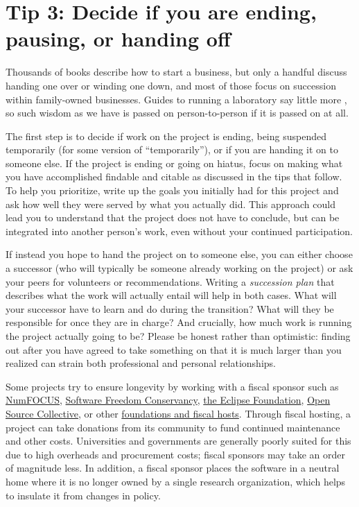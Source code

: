 \documentclass[10pt,letterpaper]{article}
\begin{document}
\section*{Tip 3: Decide if you are ending, pausing, or handing off}

Thousands of books describe how to start a business,
but only a handful discuss handing one over or winding one down,
and most of those focus on succession within family-owned businesses.
Guides to running a laboratory say little more \cite{Barker2010,Cohen2018},
so such wisdom as we have is passed on person-to-person if it is passed on at all.

The first step is to decide if work on the project is ending,
being suspended temporarily (for some version of ``temporarily''),
or if you are handing it on to someone else.
If the project is ending or going on hiatus,
focus on making what you have accomplished findable and citable
as discussed in the tips that follow.
To help you prioritize,
write up the goals you initially had for this project
and ask how well they were served by what you actually did. This approach could lead you to understand that the project does not have to conclude, but can be integrated into another person's work, even without your continued participation.

If instead you hope to hand the project on to someone else,
you can either choose a successor
(who will typically be someone already working on the project)
or ask your peers for volunteers or recommendations.
Writing a \emph{succession plan} that describes what the work will actually entail
will help in both cases.
What will your successor have to learn and do during the transition?
What will they be responsible for once they are in charge?
And crucially,
how much work is running the project actually going to be?
Please be honest rather than optimistic:
finding out after you have agreed to take something on
that it is much larger than you realized
can strain both professional and personal relationships.

Some projects try to ensure longevity by working with a fiscal sponsor such as
\href{https://numfocus.org/}{NumFOCUS},
\href{https://sfconservancy.org/}{Software Freedom Conservancy},
\href{https://www.eclipse.org/}{the Eclipse Foundation},
\href{https://oscollective.org/}{Open Source Collective},
or other \href{https://sustainoss.org/academic-map/organizations/}{foundations and fiscal hosts}.
Through fiscal hosting,
a project can take donations from its community to fund continued maintenance and other costs.
Universities and governments are generally poorly suited for this due to high overheads and procurement costs;
fiscal sponsors may take an order of magnitude less.
In addition,
a fiscal sponsor places the software in a neutral home
where it is no longer owned by a single research organization,
which helps to insulate it from changes in policy.
\end{document}
